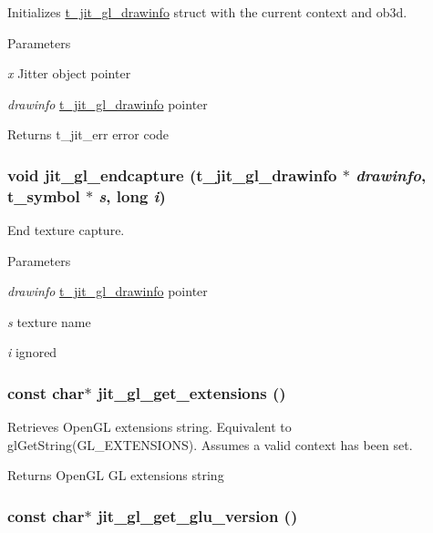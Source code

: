 Initializes \hyperlink{structt__jit__gl__drawinfo}{t\_\-jit\_\-gl\_\-drawinfo} struct with the current context and ob3d. 
\begin{DoxyParams}{Parameters}
\item[{\em x}]Jitter object pointer \item[{\em drawinfo}]\hyperlink{structt__jit__gl__drawinfo}{t\_\-jit\_\-gl\_\-drawinfo} pointer\end{DoxyParams}
\begin{DoxyReturn}{Returns}
t\_\-jit\_\-err error code 
\end{DoxyReturn}
\hypertarget{group__ob3dmod_ga31fe756839195ae9d278b63c70137cee}{
\subsubsection[{jit\_\-gl\_\-endcapture}]{\setlength{\rightskip}{0pt plus 5cm}void jit\_\-gl\_\-endcapture ({\bf t\_\-jit\_\-gl\_\-drawinfo} $\ast$ {\em drawinfo}, \/  {\bf t\_\-symbol} $\ast$ {\em s}, \/  long {\em i})}}
\label{group__ob3dmod_ga31fe756839195ae9d278b63c70137cee}


End texture capture. 
\begin{DoxyParams}{Parameters}
\item[{\em drawinfo}]\hyperlink{structt__jit__gl__drawinfo}{t\_\-jit\_\-gl\_\-drawinfo} pointer \item[{\em s}]texture name \item[{\em i}]ignored \end{DoxyParams}
\hypertarget{group__ob3dmod_gaae341db507889b8c5bf5a6e0d6f9e03f}{
\subsubsection[{jit\_\-gl\_\-get\_\-extensions}]{\setlength{\rightskip}{0pt plus 5cm}const char$\ast$ jit\_\-gl\_\-get\_\-extensions ()}}
\label{group__ob3dmod_gaae341db507889b8c5bf5a6e0d6f9e03f}


Retrieves OpenGL extensions string. Equivalent to glGetString(GL\_\-EXTENSIONS). Assumes a valid context has been set.

\begin{DoxyReturn}{Returns}
OpenGL GL extensions string 
\end{DoxyReturn}
\hypertarget{group__ob3dmod_ga62580f14c9103c4433d4a6811c1cc364}{
\subsubsection[{jit\_\-gl\_\-get\_\-glu\_\-version}]{\setlength{\rightskip}{0pt plus 5cm}const char$\ast$ jit\_\-gl\_\-get\_\-glu\_\-version ()}}
\label{group__ob3dmod_ga62580f14c9103c4433d4a6811c1cc364}


